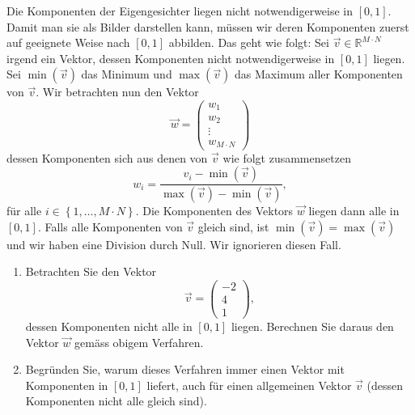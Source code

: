 Die Komponenten der Eigengesichter liegen nicht notwendigerweise in $\left[0,1\right]$.
Damit man sie als Bilder darstellen kann, müssen wir deren Komponenten zuerst auf geeignete Weise nach $\left[0,1\right]$ abbilden.
Das geht wie folgt:
Sei $\vec v\in\mathbb R^{M\cdot N}$ irgend ein Vektor, dessen Komponenten nicht notwendigerweise in $\left[0,1\right]$ liegen.
Sei $\min\left(\vec v\right)$ das Minimum und $\max\left(\vec v\right)$ das Maximum aller Komponenten von $\vec v$.
Wir betrachten nun den Vektor
\begin{equation*}
	\vec w=
	\begin{pmatrix}
		w_1 \\
		w_2 \\
		\vdots \\
		w_{M\cdot N}
	\end{pmatrix}
\end{equation*}
dessen Komponenten sich aus denen von $\vec v$ wie folgt zusammensetzen
\begin{equation*}
	w_i=\frac{v_i-\min\left(\vec v\right)}{\max\left(\vec v\right)-\min\left(\vec v\right)},
\end{equation*}
für alle $i\in\left\{1,\ldots,M\cdot N\right\}$.
Die Komponenten des Vektors $\vec w$ liegen dann alle in $\left[0,1\right]$.
Falls alle Komponenten von $\vec v$ gleich sind, ist $\min\left(\vec v\right)=\max\left(\vec v\right)$ und wir haben eine Division durch Null.
Wir ignorieren diesen Fall.
\begin{aufgabe}
	\phantom{text}
	\begin{enumerate}[label=(\alph*)]
		\item Betrachten Sie den Vektor
		\begin{equation*}
			\vec v=
			\begin{pmatrix}
				-2 \\
				4 \\
				1
			\end{pmatrix},
		\end{equation*}
		dessen Komponenten nicht alle in $\left[0,1\right]$ liegen.
		Berechnen Sie daraus den Vektor $\vec w$ gemäss obigem Verfahren.
		\item Begründen Sie, warum dieses Verfahren immer einen Vektor mit Komponenten in $\left[0,1\right]$ liefert, auch für einen allgemeinen Vektor $\vec v$ (dessen Komponenten nicht alle gleich sind).
	\end{enumerate}
\end{aufgabe}
